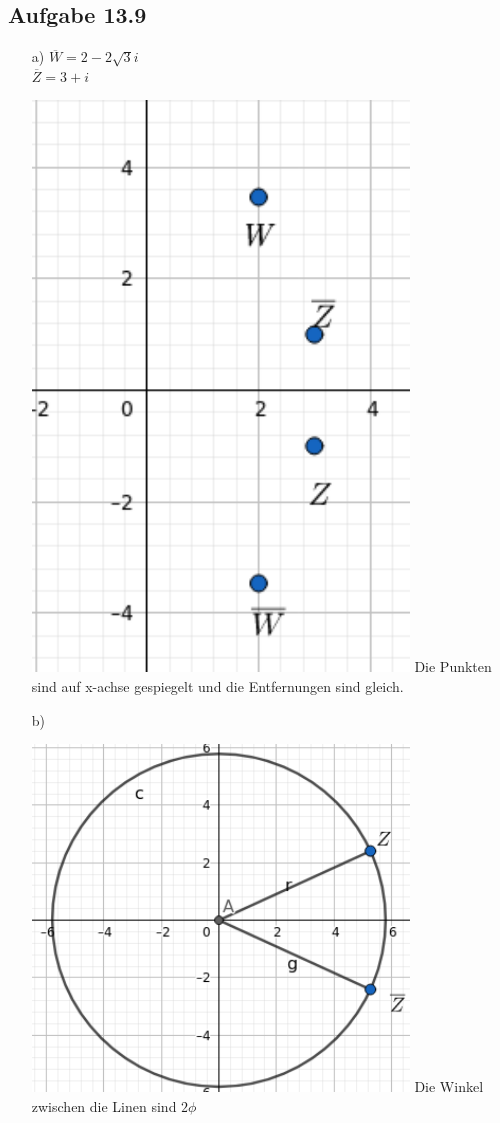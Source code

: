 \documentclass{standalone}
\begin{document}
\subsection{Aufgabe 13.9}
\begin{itemize}
	\item[a)] 
$\overline{W} = 2-2\sqrt{3} i$\\
$\overline{Z} = 3+i$\\
    \begin{center}
	\includegraphics[width=10cm]{img/13_9_a.png}
	Die Punkten sind auf x-achse gespiegelt und die Entfernungen sind gleich.\\
\end{center}

	\item[b)]
	\begin{center}
		\includegraphics[width=10cm]{img/13_9_b.png}
		Die Winkel zwischen die Linen sind $2\phi$\\
	\end{center}

\end{itemize}
\end{document}
